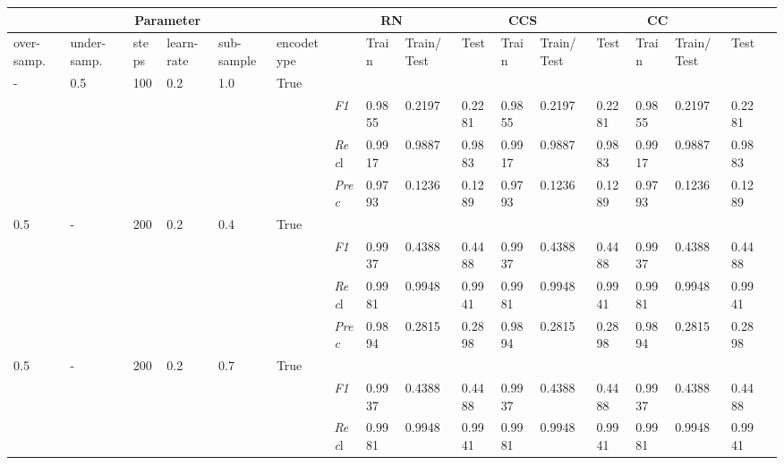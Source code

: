     \begin{table}[]
    \tiny
    \tabcolsep=0.11cm
    \begin{tabularx}{\textwidth}{XXXXXX|X|XXX|XXX|XXXX}
    \toprule
    \multicolumn{6}{c}{Parameter} & \multicolumn{3}{c}{RN} & \multicolumn{3}{c}{CCS} & \multicolumn{3}{c}{CC} \\ \midrule
    over-\newline samp. & under-\newline samp. & steps &learn-\newline rate & sub-\newline sample & encode\newline type & & Train & Train/\newline Test & Test & Train & Train/\newline Test & Test & Train & Train/\newline Test & Test \\ \midrule
    - & 0.5 & 100 & 0.2 & 1.0 &True & & & & & & & & & \\
    & & & & & & \textit{F1} & 0.9855 & 0.2197 & 0.2281 & 0.9855 & 0.2197        & 0.2281        & 0.9855        & 0.2197        & 0.2281        \\
    & & & & & & \textit{Rec}l & 0.9917 & 0.9887 & 0.9883    & 0.9917 & 0.9887    & 0.9883    & 0.9917    & 0.9887    & 0.9883    \\
    & & & & & & \textit{Prec} & 0.9793 & 0.1236 & 0.1289 & 0.9793 & 0.1236 & 0.1289 & 0.9793 & 0.1236 & 0.1289 \\ \midrule
    0.5 & - & 200 & 0.2 & 0.4 &True & & & & & & & & & \\
    & & & & & & \textit{F1} & 0.9937 & 0.4388 & 0.4488 & 0.9937 & 0.4388        & 0.4488        & 0.9937        & 0.4388        & 0.4488        \\
    & & & & & & \textit{Rec}l & 0.9981 & 0.9948 & 0.9941    & 0.9981 & 0.9948    & 0.9941    & 0.9981    & 0.9948    & 0.9941    \\
    & & & & & & \textit{Prec} & 0.9894 & 0.2815 & 0.2898 & 0.9894 & 0.2815 & 0.2898 & 0.9894 & 0.2815 & 0.2898 \\ \midrule
    0.5 & - & 200 & 0.2 & 0.7 &True & & & & & & & & & \\
    & & & & & & \textit{F1} & 0.9937 & 0.4388 & 0.4488 & 0.9937 & 0.4388        & 0.4488        & 0.9937        & 0.4388        & 0.4488        \\
    & & & & & & \textit{Rec}l & 0.9981 & 0.9948 & 0.9941    & 0.9981 & 0.9948    & 0.9941    & 0.9981    & 0.9948    & 0.9941    \\

\end{tabularx}
\end{table}

